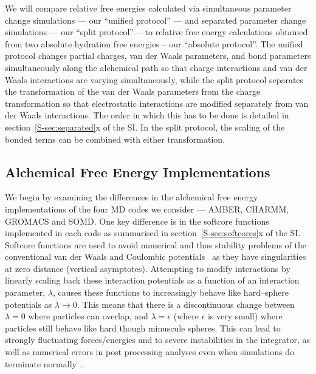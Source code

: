 \documentclass[journal=jctcce,manuscript=article]{achemso}
\begin{document}
We will compare relative free energies calculated via simultaneous parameter 
change simulations --- our ``unified protocol'' --- and separated parameter 
change simulations --- our ``split protocol''--- to relative free energy 
calculations obtained from two absolute hydration free energies -- our 
``absolute protocol''.  The unified protocol changes partial charges, van der Waals parameters, and bond parameters simultaneously along the alchemical path so that charge interactions and van der Waals interactions are varying simultaneously, while the split protocol separates the transformation of the van der Waals parameters from the charge transformation so that electrostatic interactions are modified separately from van der Waals interactions.
The order in which this has to be done is detailed in 
section~\ref{S-sec:separated}x of the SI.  In the split protocol, the scaling 
of the bonded terms can be combined with either transformation.


\subsection{Alchemical Free Energy Implementations}
\label{sec:afe_impl}

We begin by examining the differences in the alchemical free energy
implementations of the four MD codes we consider --- AMBER, CHARMM, GROMACS and
SOMD.  One key difference is in the softcore
functions~\cite{beutler_avoiding_1994, zacharias_separationshifted_1994} 
implemented in each code as summarised in section~\ref{S-sec:softcores}x of the 
SI.  Softcore functions are used to avoid numerical and thus
stability problems of the conventional van der Waals and Coulombic
potentials~\cite{steinbrecher_nonlinear_2007} as they have singularities at 
zero distance (vertical asymptotes).  Attempting to modify interactions by 
linearly scaling back these interaction potentials as a function of an 
interaction parameter, $\lambda$, causes these functions to increasingly behave 
like hard--sphere potentials as $\lambda\rightarrow 0$.  This means that there 
is a discontinuous change between $\lambda = 0$ where particles can overlap, 
and $\lambda = \epsilon$ (where $\epsilon$ is very small) where particles still 
behave like hard though minuscule spheres. This can lead to strongly 
fluctuating forces/energies and to severe instabilities in the integrator, as 
well as numerical errors in post processing analyses even when simulations do 
terminate normally~\cite{beutler_avoiding_1994, 
zacharias_separationshifted_1994, steinbrecher_nonlinear_2007}.
\end{document}
